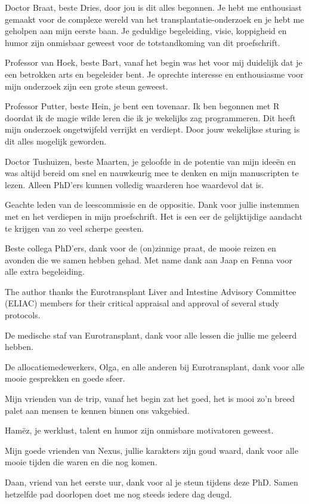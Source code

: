 \documentclass[11pt,english,]{book} %
\begin{document}
Doctor Braat, beste Dries, door jou is dit alles begonnen. Je hebt me enthousiast gemaakt voor de complexe wereld van het transplantatie-onderzoek en je hebt me geholpen aan mijn eerste baan. Je geduldige begeleiding, visie, koppigheid en humor zijn onmisbaar geweest voor de totstandkoming van dit proefschrift.

Professor van Hoek, beste Bart, vanaf het begin was het voor mij duidelijk dat je een betrokken arts en begeleider bent. Je oprechte interesse en enthousiasme voor mijn onderzoek zijn een grote steun geweest.

Professor Putter, beste Hein, je bent een tovenaar. Ik ben begonnen met R doordat ik de magie wilde leren die ik je wekelijks zag programmeren. Dit heeft mijn onderzoek ongetwijfeld verrijkt en verdiept. Door jouw wekelijkse sturing is dit alles mogelijk geworden.

Doctor Tushuizen, beste Maarten, je geloofde in de potentie van mijn ideeën en was altijd bereid om snel en nauwkeurig mee te denken en mijn manuscripten te lezen. Alleen PhD'ers kunnen volledig waarderen hoe waardevol dat is.

Geachte leden van de leescommissie en de oppositie. Dank voor jullie instemmen met en het verdiepen in mijn proefschrift. Het is een eer de gelijktijdige aandacht te krijgen van zo veel scherpe geesten.

Beste collega PhD'ers, dank voor de (on)zinnige praat, de mooie reizen en avonden die we samen hebben gehad. Met name dank aan Jaap en Fenna voor alle extra begeleiding.

The author thanks the Eurotransplant Liver and Intestine Advisory Committee (ELIAC) members for their critical appraisal and approval of several study protocols.

De medische staf van Eurotransplant, dank voor alle lessen die jullie me geleerd hebben.

De allocatiemedewerkers, Olga, en alle anderen bij Eurotransplant, dank voor alle mooie gesprekken en goede sfeer.

Mijn vrienden van de trip, vanaf het begin zat het goed, het is mooi zo'n breed palet aan mensen te kennen binnen ons vakgebied.

Hamëz, je werklust, talent en humor zijn onmisbare motivatoren geweest.

Mijn goede vrienden van Nexus, jullie karakters zijn goud waard, dank voor alle mooie tijden die waren en die nog komen.

Daan, vriend van het eerste uur, dank voor al je steun tijdens deze PhD. Samen hetzelfde pad doorlopen doet me nog steeds iedere dag deugd.
\end{document}

